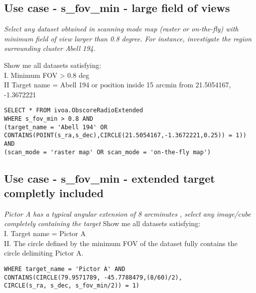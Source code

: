 \subsection{Use case - s\_fov\_min - large field of views}
\textit{Select any dataset obtained in scanning mode map (raster or on-the-fly) with minimum field of view larger than 0.8 degree. For instance, investigate the region surrounding cluster Abell 194.}

Show me all datasets satisfying:\\
I. Minimum FOV > 0.8 deg \\
II Target name = Abell 194 or position inside 15 arcmin from 21.5054167, -1.3672221 \\
\begin{verbatim}
SELECT * FROM ivoa.ObscoreRadioExtended
WHERE s_fov_min > 0.8 AND
(target_name = 'Abell 194' OR
CONTAINS(POINT(s_ra,s_dec),CIRCLE(21.5054167,-1.3672221,0.25)) = 1)) AND
(scan_mode = 'raster map' OR scan_mode = 'on-the-fly map')
\end{verbatim}

\subsection{Use case - s\_fov\_min - extended target completly included}
\textit{Pictor A has a typical angular extension  of 8 arcminutes , select any image/cube completely containing the target}
Show me all datasets satisfying: \\
I. Target name = Pictor A \\
II. The circle defined by the minimum FOV of the dataset fully contains the circle delimiting Pictor A. \\
\begin{verbatim}
WHERE target_name = 'Pictor A' AND
CONTAINS(CIRCLE(79.9571789, -45.7788479,(8/60)/2),
CIRCLE(s_ra, s_dec, s_fov_min/2)) = 1)
\end{verbatim}


